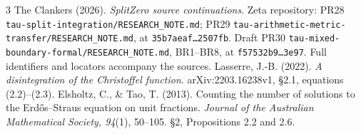 \documentclass[10pt,a4paper]{article}
\begin{document}
\begingroup\small
\begin{thebibliography}{3}
 The Clankers (2026). \emph{SplitZero source continuations}.
Zeta repository: PR28 \texttt{tau-split-integration/RESEARCH\_NOTE.md};
PR29 \texttt{tau-arithmetic-metric-transfer/RESEARCH\_NOTE.md}, at
\texttt{35b7aeaf\ldots2507fb}. Draft PR30
\texttt{tau-mixed-boundary-formal/RESEARCH\_NOTE.md}, BR1--BR8,
at \texttt{f57532b9\ldots3e97}. Full identifiers and locators accompany the sources.
 Lasserre, J.-B. (2022). \emph{A disintegration of the Christoffel
function}. arXiv:2203.16238v1, \S2.1, equations (2.2)--(2.3).
 Elsholtz, C., \& Tao, T. (2013). Counting the number of solutions
to the Erd\H{o}s--Straus equation on unit fractions.
\emph{Journal of the Australian Mathematical Society, 94}(1), 50--105.
\S2, Propositions 2.2 and 2.6.
\end{thebibliography}
\endgroup
\end{document}
